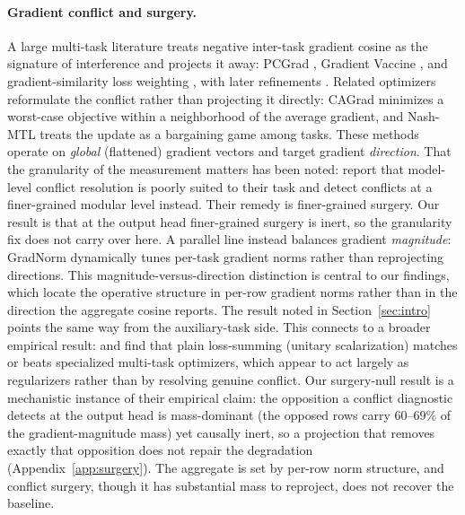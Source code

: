 \paragraph{Gradient conflict and surgery.} A large multi-task literature treats
negative inter-task gradient cosine as the signature of interference and
projects it away: PCGrad \citep{yu2020pcgrad}, Gradient Vaccine
\citep{wang2021gradvaccine}, and gradient-similarity loss weighting
\citep{du2018auxsim}, with later refinements \citep{sun2023drmgf,shi2023recon}.
Related optimizers reformulate the conflict rather than projecting it directly:
CAGrad \citep{liu2021cagrad} minimizes a worst-case objective within a neighborhood
of the average gradient, and Nash-MTL \citep{navon2022nashmtl} treats the update as a
bargaining game among tasks.
These methods operate on \emph{global} (flattened) gradient vectors and target
gradient \emph{direction}. That the granularity of the measurement matters has been
noted: \citet{liu2025modular} report that model-level conflict resolution is
poorly suited to their task and detect conflicts at a finer-grained modular
level instead. Their remedy is finer-grained surgery. Our result is that at the
output head finer-grained surgery is inert, so the granularity fix does not
carry over here. A parallel line instead balances gradient
\emph{magnitude}: GradNorm \citep{chen2018gradnorm} dynamically tunes per-task
gradient norms rather than reprojecting directions. This magnitude-versus-direction
distinction is central to our findings, which locate the operative structure in
per-row gradient norms rather than in the direction the aggregate cosine reports.
The \citet{jiang2023forkmerge} result noted in Section~\ref{sec:intro} points the
same way from the auxiliary-task side. This connects to a broader empirical result: \citet{kurin2022unitary} and
\citet{xin2022mtohelp} find that plain loss-summing (unitary scalarization)
matches or beats specialized multi-task optimizers, which appear to act largely
as regularizers rather than by resolving genuine conflict. Our surgery-null
result is a mechanistic instance of their empirical claim: the opposition a
conflict diagnostic detects at the output head is mass-dominant (the opposed rows
carry $60$--$69\%$ of the gradient-magnitude mass) yet causally inert, so a
projection that removes exactly that opposition does not repair the degradation
(Appendix~\ref{app:surgery}). The aggregate is set by per-row norm structure, and
conflict surgery, though it has substantial mass to reproject, does not recover
the baseline.

